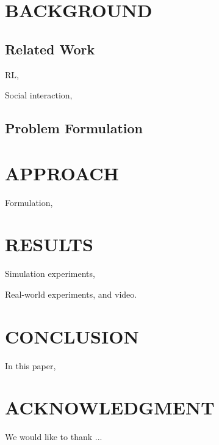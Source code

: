\documentclass[letterpaper, 10 pt, conference]{ieeeconf}  %
\begin{document}
\section{BACKGROUND} \label{sec:background} 

\subsection{Related Work}

RL, 
\vspace{2cm}

Social interaction, 
\vspace{2cm}

\subsection{Problem Formulation}

\section{APPROACH} \label{sec:approach} 

Formulation, 

\section{RESULTS} \label{sec:results} 

Simulation experiments, 

Real-world experiments, and video. 

\section{CONCLUSION} \label{sec:conclusion} 

In this paper, 


\addtolength{\textheight}{-10cm}   %

\section*{ACKNOWLEDGMENT}

We would like to thank ... 





\end{document}
